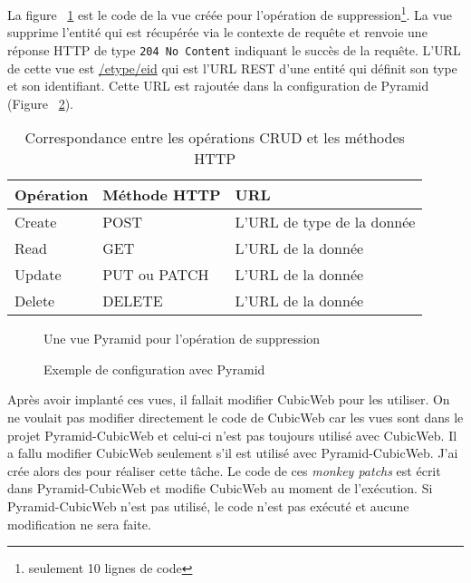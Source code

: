 La figure ~\ref{fig:delete} est le code de la vue créée pour l'opération de
suppression\footnote{seulement 10 lignes de code}. La vue supprime l'entité qui
est récupérée via le contexte de requête et renvoie une réponse HTTP de type
\texttt{204~No~Content} indiquant le succès de la requête. L'URL de cette vue
est \url{/etype/eid} qui est l'URL REST d'une entité qui définit son type et
son identifiant. Cette URL est rajoutée dans la configuration de Pyramid
(Figure ~\ref{fig:figpyramidconf}).

    \begin{table} \centering
        \begin{tabular}{|>{\centering\arraybackslash}m{}
            |>{\centering\arraybackslash}m{}
        |>{\centering\arraybackslash}m{}|} \hline \cellcolor{Gray}
        \textbf{Opération} & \cellcolor{Gray} \textbf{Méthode HTTP} &
        \cellcolor{Gray} \textbf{URL} \\ \hline Create & POST & L'URL de type
        de la donnée\\ \hline Read   & GET & L'URL de la donnée\\ \hline Update
                                      & PUT ou PATCH & L'URL de la donnée \\
        \hline Delete & DELETE & L'URL de la donnée \\ \hline \end{tabular}
    \caption{Correspondance entre les opérations CRUD et les méthodes HTTP}
\label{table:crud} \end{table}


\begin{figure}[htp] 
    \centering
    \caption{Une vue Pyramid pour l'opération de suppression} 
    \label{fig:delete} 
\end{figure}

\begin{figure}[htp] 
    \centering
    \caption{Exemple de configuration avec Pyramid} 
    \label{fig:figpyramidconf} 
\end{figure}



Après avoir implanté ces vues, il fallait modifier CubicWeb pour les utiliser. 
On ne voulait pas modifier directement le code de CubicWeb car
les vues sont dans le projet Pyramid-CubicWeb et celui-ci n'est pas toujours
utilisé avec CubicWeb. Il a fallu modifier CubicWeb seulement s'il est utilisé
avec Pyramid-CubicWeb. J'ai crée alors des
 pour réaliser cette tâche. Le
code de ces \textit{monkey patchs} est écrit dans Pyramid-CubicWeb et modifie
CubicWeb au moment de l'exécution. Si Pyramid-CubicWeb n'est pas utilisé, le
code n'est pas exécuté et aucune modification ne sera faite.

